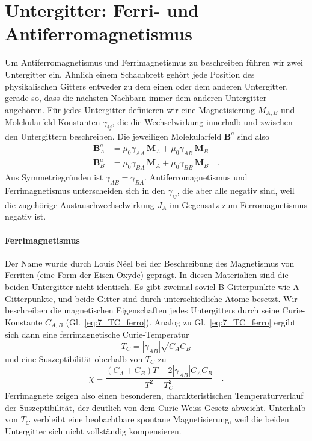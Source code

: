 
\section*{Untergitter: Ferri- und Antiferromagnetismus}

Um Antiferromagnetismus und Ferrimagnetismus zu beschreiben führen wir zwei Untergitter ein. Ähnlich einem Schachbrett gehört jede Position des physikalischen Gitters entweder zu dem einen oder dem anderen Untergitter, gerade so, dass die nächsten Nachbarn immer dem anderen Untergitter angehören. Für jedes Untergitter definieren wir eine Magnetisierung $M_{A,B}$ und Molekularfeld-Konstanten $\gamma_{ij}$, die die Wechselwirkung innerhalb und zwischen den Untergittern beschreiben. Die jeweiligen Molekularfeld $\bm{B}^a$ sind also 
\begin{align}
    \bm{B}_A^a &=  \mu_0 \gamma_{AA} \, \bm{M}_A  +  \mu_0 \gamma_{AB} \, \bm{M}_B \\
    \bm{B}_B^a &=  \mu_0 \gamma_{BA} \, \bm{M}_A  +  \mu_0 \gamma_{BB} \, \bm{M}_B    \quad .
\end{align}
Aus Symmetriegründen ist $\gamma_{AB}  = \gamma_{BA}$. 
Antiferromagnetismus und Ferrimagnetismus unterscheiden sich in den $\gamma_{ij}$, die aber alle negativ sind, weil die zugehörige Austauschwechselwirkung $J_A$ im Gegensatz zum Ferromagnetismus negativ ist.



\paragraph*{Ferrimagnetismus} Der Name wurde durch  Louis Néel bei der Beschreibung des Magnetismus von Ferriten (eine Form der Eisen-Oxyde)
geprägt. In diesen Materialien sind die beiden Untergitter nicht identisch. Es gibt zweimal soviel B-Gitterpunkte wie A-Gitterpunkte, und beide Gitter sind durch unterschiedliche Atome besetzt. Wir beschreiben die magnetischen Eigenschaften jedes Untergitters durch seine Curie-Konstante $C_{A,B}$ (Gl.~\ref{eq:7_TC_ferro}). Analog zu Gl.~\ref{eq:7_TC_ferro} ergibt sich dann eine ferrimagnetische Curie-Temperatur
\begin{equation}
    T_C = | \gamma_{AB} | \sqrt{C_A C_B}
\end{equation}
und eine Suszeptibilität oberhalb von $T_C$ zu
\begin{equation}
\chi= \frac{(C_A + C_B) T - 2 | \gamma_{AB}| C_A C_B}{T^2 - T_C^2}  \quad .
\end{equation}
Ferrimagnete zeigen also einen besonderen, charakteristischen Temperaturverlauf der Suszeptibilität, der deutlich von dem Curie-Weiss-Gesetz abweicht. Unterhalb von $T_C$ verbleibt eine beobachtbare spontane Magnetisierung, weil die beiden Untergitter sich nicht vollständig kompensieren.


